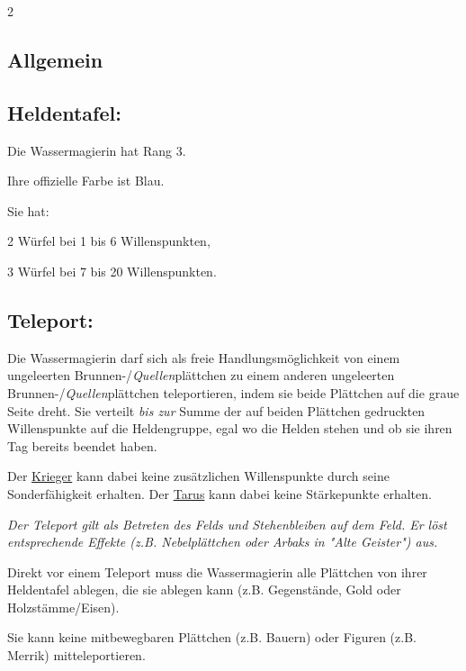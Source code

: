 \documentclass[10pt, a4paper, oneside]{book}
\newcommand{\fan}[1]{\textit{#1}}
\begin{document}
\begin{multicols*}{2}\raggedcolumns

\begin{nobgcolor}

\section{Allgemein}


\subsection{Heldentafel:}

Die Wassermagierin hat Rang 3.

Ihre offizielle Farbe ist Blau.

Sie hat:

\bullet{} 2 Würfel bei 1 bis 6 Willenspunkten,

\bullet{} 3 Würfel bei 7 bis 20 Willenspunkten.





\subsection{Teleport:}

Die Wassermagierin darf sich als freie Handlungsmöglichkeit von einem ungeleerten Brunnen-/\fan{Quellen}plättchen zu einem anderen ungeleerten Brunnen-/\fan{Quellen}plättchen teleportieren, indem sie beide Plättchen auf die graue Seite dreht. Sie verteilt \fan{bis zur} Summe der auf beiden Plättchen gedruckten Willenspunkte auf die Heldengruppe, egal wo die Helden stehen und ob sie ihren Tag bereits beendet haben.

Der \hyperref[Krieger]{Krieger} kann dabei keine zusätzlichen Willenspunkte durch seine Sonderfähigkeit erhalten. Der \hyperref[Tarus]{Tarus} kann dabei keine Stärkepunkte erhalten.


\fan{Der Teleport gilt als Betreten des Felds und Stehenbleiben auf dem Feld. Er löst entsprechende Effekte (z.B. Nebelplättchen oder Arbaks in "Alte Geister") aus.}


Direkt vor einem Teleport muss die Wassermagierin alle Plättchen von ihrer Heldentafel ablegen, die sie ablegen kann (z.B. Gegenstände, Gold oder Holzstämme/Eisen).

Sie kann keine mitbewegbaren Plättchen (z.B. Bauern) oder Figuren (z.B. Merrik) mitteleportieren.






\end{nobgcolor}
\end{multicols*}
\end{document}
